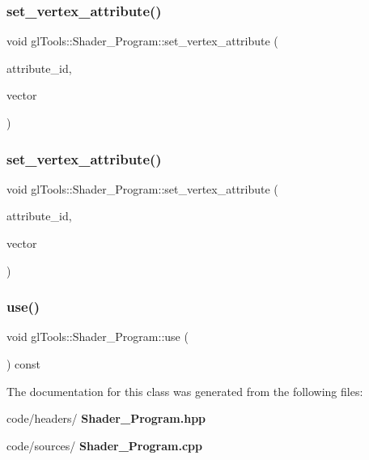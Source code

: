 \mbox{\label{classgl_tools_1_1_shader___program_aea80cfdb3f29ec582b3aef13c6746ed9}} 
\subsubsection{set\_vertex\_attribute()\hspace{0.1cm}{\footnotesize\ttfamily [3/4]}}
{\footnotesize\ttfamily void gl\+Tools\+::\+Shader\+\_\+\+Program\+::set\+\_\+vertex\+\_\+attribute (\begin{DoxyParamCaption}\item[{G\+Lint}]{attribute\+\_\+id,  }\item[{const Vector3f \&}]{vector }\end{DoxyParamCaption})\hspace{0.3cm}{\ttfamily [inline]}}

\mbox{\label{classgl_tools_1_1_shader___program_a04dd19e945e06baf77f44a2b2e28a8d5}} 
\subsubsection{set\_vertex\_attribute()\hspace{0.1cm}{\footnotesize\ttfamily [4/4]}}
{\footnotesize\ttfamily void gl\+Tools\+::\+Shader\+\_\+\+Program\+::set\+\_\+vertex\+\_\+attribute (\begin{DoxyParamCaption}\item[{G\+Lint}]{attribute\+\_\+id,  }\item[{const Vector4f \&}]{vector }\end{DoxyParamCaption})\hspace{0.3cm}{\ttfamily [inline]}}

\mbox{\label{classgl_tools_1_1_shader___program_a22bed6b91e6ae1dfd5897af9312affe4}} 
\subsubsection{use()}
{\footnotesize\ttfamily void gl\+Tools\+::\+Shader\+\_\+\+Program\+::use (\begin{DoxyParamCaption}{ }\end{DoxyParamCaption}) const\hspace{0.3cm}{\ttfamily [inline]}}



The documentation for this class was generated from the following files\+:\begin{DoxyCompactItemize}
\item 
code/headers/\textbf{ Shader\+\_\+\+Program.\+hpp}\item 
code/sources/\textbf{ Shader\+\_\+\+Program.\+cpp}\end{DoxyCompactItemize}
